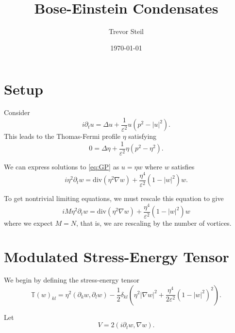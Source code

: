 \documentclass[a4paper]{article}
\title{Bose-Einstein Condensates }
\date{\today}
\author{Trevor Steil}
\renewcommand{\div}{\mathrm{div}}
\newlength{\horizspace}
\newlength{\smallspace}
\begin{document}
\maketitle


\setlength{\horizspace}{1.5cm}
\setlength{\smallspace}{.7cm}

\section{Setup}
Consider
\begin{equation} \label{eq:GP}
  i \partial_t u = \Delta u + \frac{1}{\varepsilon^2} u (p^2 - |u|^2).
\end{equation}
This leads to the Thomas-Fermi profile $\eta$ satisfying
\begin{equation} \label{eq:Thomas-Fermi}
  0 = \Delta \eta + \frac{1}{\varepsilon^2} \eta (p^2 - \eta^2).
\end{equation}

We can express solutions to \eqref{eq:GP} as $u = \eta w$ where $w$ satisfies
\begin{equation} \label{eq:PDE}
  i \eta^2 \partial_t w = \div ( \eta^2 \nabla w ) + \frac{\eta^4}{\varepsilon^2} ( 1 - |w|^2 ) w.
\end{equation}

To get nontrivial limiting equations, we must rescale this equation to give
\begin{equation}
  i M \eta^2 \partial_t w = \div ( \eta^2 \nabla w ) + \frac{\eta^4}{\varepsilon^2}(1 - |w|^2)w
  \label{eq:rescaled_PDE}
\end{equation}
where we expect $M = N$, that is, we are rescaling by the number of vortices.


\section{Modulated Stress-Energy Tensor}

We begin by defining the stress-energy tensor
\begin{equation}
  \mathbb{T}(w)_{kl} = \eta^2 ( \partial_k w, \partial_l w) - \frac{1}{2} \delta_{kl} \left( \eta^2 | \nabla w |^2 + \frac{\eta^4}{2 \varepsilon^2} ( 1 - |w|^2
  )^2 \right).
  \label{eq:stress-energy}
\end{equation}

Let
\[ V = 2( i \partial_t w, \nabla w) .\]
\end{document}
